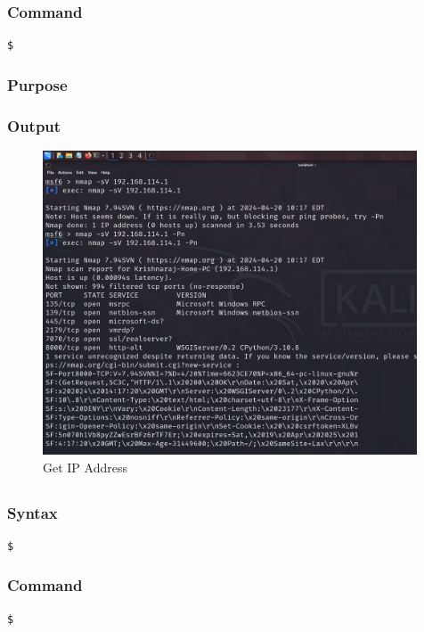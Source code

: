 \documentclass[11pt]{article}
\begin{document}
\subsubsection*{Command}
\begin{verbatim}
$
\end{verbatim}

\subsubsection*{Purpose}

\subsubsection*{Output}
\begin{figure}[H]
    \centering
    \includegraphics[width=0.99\textwidth]{a3_ss (16).png}
    \caption{Get IP Address}
    \label{fig:1}
\end{figure}
\subsection{}

\subsubsection*{Syntax}
\begin{verbatim}
$
\end{verbatim}

\subsubsection*{Command}
\begin{verbatim}
$
\end{verbatim}
\end{document}
